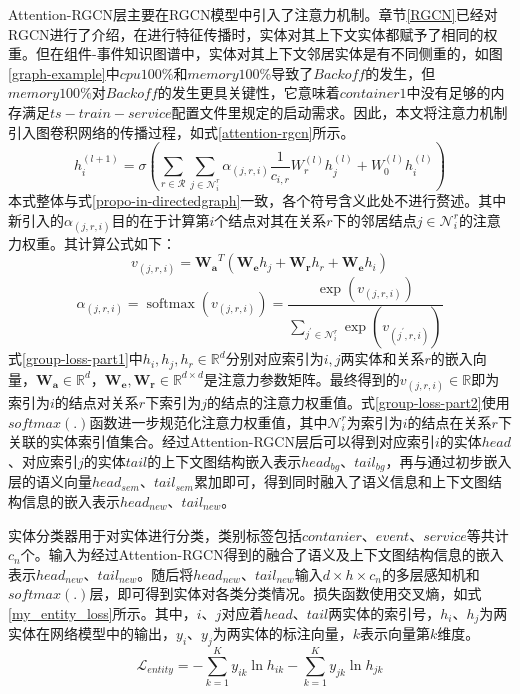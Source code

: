 Attention-RGCN层主要在RGCN模型中引入了注意力机制。章节\ref{RGCN}已经对RGCN进行了介绍，在进行特征传播时，实体对其上下文实体都赋予了相同的权重。但在组件-事件知识图谱中，实体对其上下文邻居实体是有不同侧重的，如图\ref{graph-example}中$cpu 100\%$和$memory 100\%$导致了$Backoff$的发生，但$memory 100\%$对$Backoff$的发生更具关键性，它意味着$container1$中没有足够的内存满足$ts-train-service$配置文件里规定的启动需求。因此，本文将注意力机制引入图卷积网络的传播过程，如式\ref{attention-rgcn}所示。
\begin{equation}
    h_{i}^{(l+1)}=\sigma\left(\sum_{r \in \mathcal{R}} \sum_{j \in \mathcal{N}_{i}^{r}} \alpha_{(j, r, i)} \frac{1}{c_{i, r}} W_{r}^{(l)} h_{j}^{(l)}+W_{0}^{(l)} h_{i}^{(l)}\right)
    \label{attention-rgcn}
\end{equation}
本式整体与式\ref{propo-in-directedgraph}一致，各个符号含义此处不进行赘述。其中新引入的$\alpha_{(j, r, i)}$目的在于计算第$i$个结点对其在关系$r$下的邻居结点$j \in \mathcal{N}_{i}^{r}$的注意力权重。其计算公式如下：
\begin{equation}
    v_{(j, r, i)}=\mathbf{W_a}^{T}\left(\mathbf{W_e} h_{j}+\mathbf{W_r} h_{r} + \mathbf{W_e} h_{i}\right)
    \label{group-loss-part1}
\end{equation}
\begin{equation}
    \alpha_{(j, r, i)}=\operatorname{softmax}\left(v_{(j, r, i)}\right)=\frac{\exp \left(v_{(j, r, i)}\right)}{\sum_{j^{\prime} \in \mathcal{N}_{i}^{r}} \exp \left(v_{\left(j^{\prime}, r, i\right)}\right)}
    \label{group-loss-part2}
\end{equation}
式\ref{group-loss-part1}中$h_i,h_j,h_r\in\mathbb{R}^{d}$分别对应索引为$i,j$两实体和关系$r$的嵌入向量，$\mathbf{W_a}\in \mathbb{R}^{d}$，$\mathbf{W_e},\mathbf{W_r} \in \mathbb{R}^{d\times d}$是注意力参数矩阵。最终得到的$ v_{(j, r, i)} \in \mathbb{R}$即为索引为$i$的结点对关系$r$下索引为$j$的结点的注意力权重值。式\ref{group-loss-part2}使用$softmax(.)$函数进一步规范化注意力权重值，其中$\mathcal{N}_{i}^{r}$为索引为$i$的结点在关系$r$下关联的实体索引值集合。经过Attention-RGCN层后可以得到对应索引$i$的实体$head$、对应索引$j$的实体$tail$的上下文图结构嵌入表示$head_{bg}$、$tail_{bg}$，再与通过初步嵌入层的语义向量$head_{sem}$、$tail_{sem}$累加即可，得到同时融入了语义信息和上下文图结构信息的嵌入表示$head_{new}$、$tail_{new}$。

实体分类器用于对实体进行分类，类别标签包括$contanier$、$event$、$service$等共计$c_{n}$个。输入为经过Attention-RGCN得到的融合了语义及上下文图结构信息的嵌入表示$head_{new}$、$tail_{new}$。随后将$head_{new}$、$tail_{new}$输入$d \times h \times c_{n}$的多层感知机和$softmax(.)$层，即可得到实体对各类分类情况。损失函数使用交叉熵，如式\ref{my_entity_loss}所示。其中，$i$、$j$对应着$head$、$tail$两实体的索引号，$h_i$、$h_j$为两实体在网络模型中的输出，$y_i$、$y_j$为两实体的标注向量，$k$表示向量第$k$维度。
\begin{equation}
    \mathcal{L}_{entity}= - \sum_{k=1}^{K} y_{i k} \ln h_{i k} - \sum_{k=1}^{K} y_{j k} \ln h_{j k}
    \label{my_entity_loss}
\end{equation}

